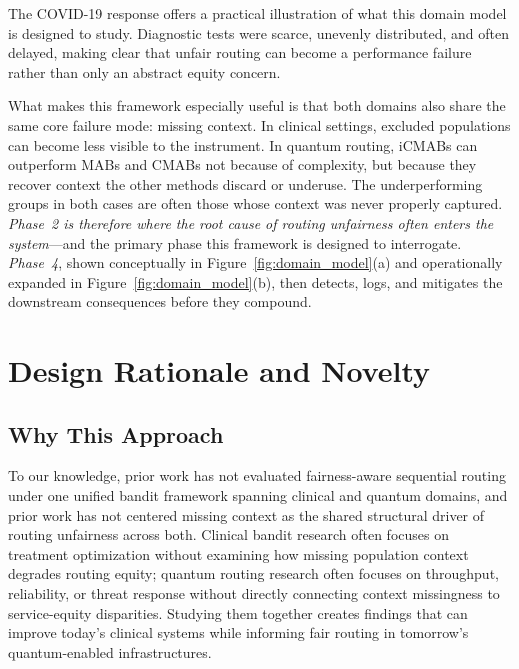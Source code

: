 \documentclass{IEEEtran}
\begin{document}
The COVID-19 response offers a practical illustration of what this domain model is
designed to study. Diagnostic tests were scarce, unevenly distributed, and
often delayed, making clear that unfair routing can become a performance
failure rather than only an abstract equity concern.

What makes this framework especially useful is that both domains also share the same core failure mode: missing
context. In clinical settings, excluded populations can become less visible to
the instrument. In quantum routing, iCMABs can outperform MABs and CMABs not because of complexity, but because they recover context the
other methods discard or underuse. The underperforming groups in both cases
are often those whose context was never properly captured.
\textit{Phase~2 is therefore where the root cause of routing unfairness often
enters the system}---and the primary phase this framework is designed to interrogate.
\textit{Phase~4}, shown conceptually in Figure~\ref{fig:domain_model}(a) and
operationally expanded in Figure~\ref{fig:domain_model}(b), then detects,
logs, and mitigates the downstream consequences before they compound.

\section{Design Rationale and Novelty}

\subsection{Why This Approach}
To our knowledge, prior work has not evaluated fairness-aware sequential
routing under one unified bandit framework spanning clinical and quantum
domains, and prior work has not centered missing context as the shared
structural driver of routing unfairness across both. Clinical bandit research
often focuses on treatment optimization without examining how missing
population context degrades routing equity; quantum routing research often
focuses on throughput, reliability, or threat response without directly
connecting context missingness to service-equity disparities. Studying them
together creates findings that can improve today's clinical systems while
informing fair routing in tomorrow's quantum-enabled infrastructures.
\end{document}
